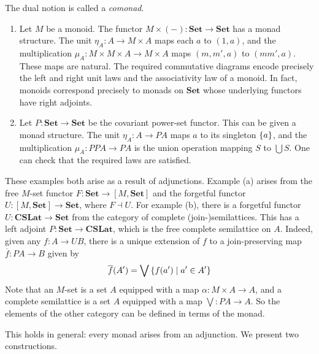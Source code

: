 The dual notion is called a \emph{comonad}.
\begin{example}
    \begin{enumerate}
        \item Let \( M \) be a monoid.
        The functor \( M \times (-) : \mathbf{Set} \to \mathbf{Set} \) has a monad structure.
        The unit \( \eta_A : A \to M \times A \) maps each \( a \) to \( (1, a) \), and the multiplication \( \mu_A : M \times M \times A \to M \times A \) maps \( (m, m', a) \) to \( (mm', a) \).
        These maps are natural.
        The required commutative diagrams encode precisely the left and right unit laws and the associativity law of a monoid.
        In fact, monoids correspond precisely to monads on \( \mathbf{Set} \) whose underlying functors have right adjoints.
        \item Let \( P : \mathbf{Set} \to \mathbf{Set} \) be the covariant power-set functor.
        This can be given a monad structure.
        The unit \( \eta_A : A \to PA \) maps \( a \) to its singleton \( \qty{a} \), and the multiplication \( \mu_A : PPA \to PA \) is the union operation mapping \( S \) to \( \bigcup S \).
        One can check that the required laws are satisfied.
    \end{enumerate}
\end{example}
These examples both arise as a result of adjunctions.
Example (a) arises from the free \( M \)-set functor \( F : \mathbf{Set} \to [M, \mathbf{Set}] \) and the forgetful functor \( U : [M, \mathbf{Set}] \to \mathbf{Set} \), where \( F \dashv U \).
For example (b), there is a forgetful functor \( U : \mathbf{CSLat} \to \mathbf{Set} \) from the category of complete (join-)semilattices.
This has a left adjoint \( P : \mathbf{Set} \to \mathbf{CSLat} \), which is the free complete semilattice on \( A \).
Indeed, given any \( f : A \to UB \), there is a unique extension of \( f \) to a join-preserving map \( \overline f : PA \to B \) given by
\[ \overline f(A') = \bigvee \qty{f(a') \mid a' \in A'} \]
Note that an \( M \)-set is a set \( A \) equipped with a map \( \alpha : M \times A \to A \), and a complete semilattice is a set \( A \) equipped with a map \( \bigvee : PA \to A \).
So the elements of the other category can be defined in terms of the monad.

This holds in general: every monad arises from an adjunction.
We present two constructions.


